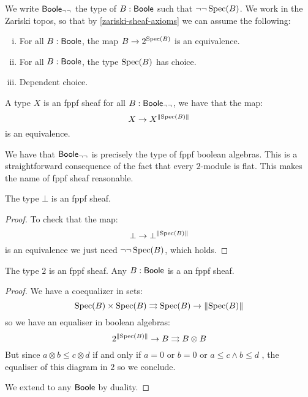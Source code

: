 We write $\mathsf{Boole}_{\neg\neg}$ the type of $B:\mathsf{Boole}$ such that $\neg\neg\operatorname{Spec}(B)$. We work in the Zariski topos, so that by \cref{zariski-sheaf-axioms} we can assume the following:

\begin{enumerate}[(i)]
\item For all $B:\mathsf{Boole}$, the map $B\to {2}^{\operatorname{Spec}(B)}$ is an equivalence.
\item For all $B:\mathsf{Boole}$, the type $\operatorname{Spec}(B)$ has choice.
\item Dependent choice.
\end{enumerate}

\begin{definition}
A type $X$ is an fppf sheaf for all $B:\mathsf{Boole}_{\neg\neg}$, we have that the map:
\[X\to X^{\lVert \operatorname{Spec}(B) \rVert}\]
is an equivalence.
\end{definition}

\begin{remark}
We have that $\mathsf{Boole}_{\neg\neg}$ is precisely the type of fppf boolean algebras. This is a straightforward consequence of the fact that every ${2}$-module is flat. This makes the name of fppf sheaf reasonable.
\end{remark}

\begin{lemma}\label{bot-sheaf}
The type $\bot$ is an fppf sheaf.
\end{lemma}

\begin{proof}
To check that the map:
\[\bot\to \bot^{\lVert \operatorname{Spec}(B) \rVert}\]
is an equivalence we just need $\neg\neg\operatorname{Spec}(B)$, which holds.
\end{proof}

\begin{lemma}\label{fppf-subcanonical}
The type ${2}$ is an fppf sheaf. Any $B:\mathsf{Boole}$ is a an fppf sheaf.
\end{lemma}

\begin{proof}
We have a coequalizer in sets:
\[\operatorname{Spec}(B)\times\operatorname{Spec}(B) \rightrightarrows \operatorname{Spec}(B)\to \lVert \operatorname{Spec}(B) \rVert \]
so we have an equaliser in boolean algebras:
\[ {2}^{\lVert \operatorname{Spec}(B) \rVert}\to B\rightrightarrows B\otimes B \]
But since $a\otimes b\leq c\otimes d$ if and only if $a=0$ or $b=0$ or $a\leq c\land b\leq d$ , the equaliser of this diagram in ${2}$ so we conclude.

We extend to any $\mathsf{Boole}$ by duality.
\end{proof}

